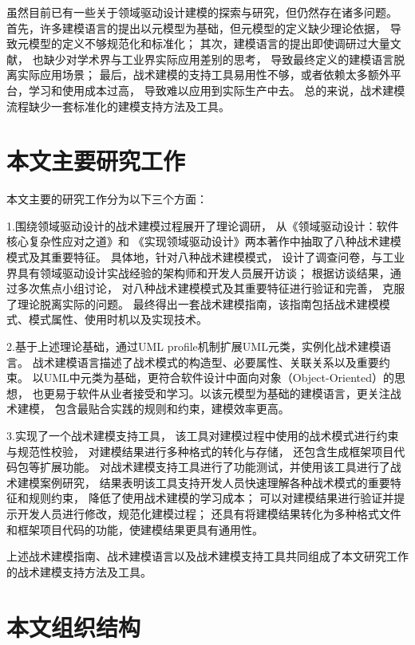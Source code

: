 虽然目前已有一些关于领域驱动设计建模的探索与研究，但仍然存在诸多问题。
首先，许多建模语言的提出以元模型为基础，但元模型的定义缺少理论依据，
导致元模型的定义不够规范化和标准化；
其次，建模语言的提出即使调研过大量文献，
也缺少对学术界与工业界实际应用差别的思考，
导致最终定义的建模语言脱离实际应用场景；
最后，战术建模的支持工具易用性不够，或者依赖太多额外平台，学习和使用成本过高，
导致难以应用到实际生产中去。
总的来说，战术建模流程缺少一套标准化的建模支持方法及工具。

\section{本文主要研究工作}

本文主要的研究工作分为以下三个方面：

1.围绕领域驱动设计的战术建模过程展开了理论调研，
从《领域驱动设计：软件核心复杂性应对之道》\cite{DBLP:books/daglib/0013521}和
《实现领域驱动设计》\cite{vernon2013implementing}两本著作中抽取了八种战术建模模式及其重要特征。
具体地，针对八种战术建模模式，
设计了调查问卷，与工业界具有领域驱动设计实战经验的架构师和开发人员展开访谈；
根据访谈结果，通过多次焦点小组讨论，
对八种战术建模模式及其重要特征进行验证和完善，
克服了理论脱离实际的问题。
最终得出一套战术建模指南，该指南包括战术建模模式、模式属性、使用时机以及实现技术。


2.基于上述理论基础，通过UML profile机制扩展UML元类，实例化战术建模语言。
战术建模语言描述了战术模式的构造型、必要属性、关联关系以及重要约束。
以UML中元类为基础，更符合软件设计中面向对象（Object-Oriented）的思想，
也更易于软件从业者接受和学习。以该元模型为基础的建模语言，更关注战术建模，
包含最贴合实践的规则和约束，建模效率更高。

3.实现了一个战术建模支持工具，
该工具对建模过程中使用的战术模式进行约束与规范性校验，
对建模结果进行多种格式的转化与存储，
还包含生成框架项目代码包等扩展功能。
对战术建模支持工具进行了功能测试，并使用该工具进行了战术建模案例研究，
结果表明该工具支持开发人员快速理解各种战术模式的重要特征和规则约束，
降低了使用战术建模的学习成本；
可以对建模结果进行验证并提示开发人员进行修改，规范化建模过程；
还具有将建模结果转化为多种格式文件和框架项目代码的功能，使建模结果更具有通用性。


上述战术建模指南、战术建模语言以及战术建模支持工具共同组成了本文研究工作的战术建模支持方法及工具。

\section{本文组织结构}

